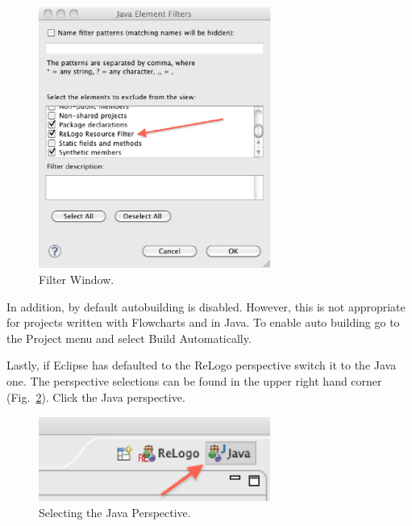 \documentclass[11pt]{amsart}
\begin{document}
\begin{figure}[h]
\begin{center}
\vspace{.2in}
\centerline {
\includegraphics[width=3in]{figs/filter_window.eps}
}
\caption{Filter Window.}
\label{fig:filter2}
\end{center}
\end{figure}

In addition, by default autobuilding is disabled. However, this is not appropriate for projects written with Flowcharts and in Java. To enable auto building go to the Project menu and select Build Automatically.

Lastly, if Eclipse has defaulted to the ReLogo perspective switch it to the Java one. The perspective selections can be found in the upper right hand corner (Fig.~\ref{fig:javap}). Click the Java perspective.

\begin{figure}[h]
\begin{center}
\vspace{.2in}
\centerline {
\includegraphics[width=3in]{figs/perspectives.eps}
}
\caption{Selecting the Java Perspective.}
\label{fig:javap}
\end{center}
\end{figure}
\end{document}
